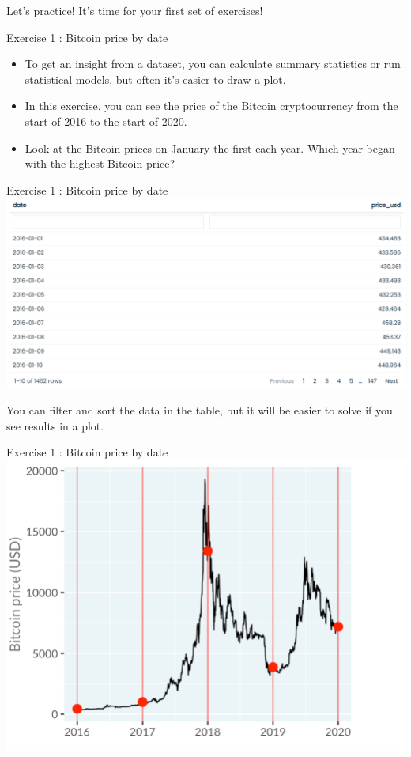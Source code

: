 \documentclass[
  ignorenonframetext,
]{beamer}
\begin{document}
\begin{frame}{Let's practice!}
\label{lets-practice}
It's time for your first set of exercises!
\end{frame}

\begin{frame}{Exercise 1 : Bitcoin price by date}
\label{exercise-1-bitcoin-price-by-date}
\begin{itemize}
\item
  To get an insight from a dataset, you can calculate summary statistics
  or run statistical models, but often it's easier to draw a plot.
\item
  In this exercise, you can see the price of the Bitcoin cryptocurrency
  from the start of 2016 to the start of 2020.
\item
  Look at the Bitcoin prices on January the first each year. Which year
  began with the highest Bitcoin price?
\end{itemize}
\end{frame}

\begin{frame}{Exercise 1 : Bitcoin price by date}
\label{exercise-1-bitcoin-price-by-date-1}
\includegraphics{../images/ex1_1.png}

You can filter and sort the data in the table, but it will be easier to
solve if you see results in a plot.
\end{frame}

\begin{frame}{Exercise 1 : Bitcoin price by date}
\label{exercise-1-bitcoin-price-by-date-2}
\includegraphics{../images/ex1_2.png}
\end{frame}
\end{document}
